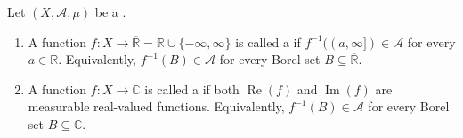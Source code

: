 \begin{definition} \label{definition:measurable_function_from_a_measure_space_into_the_extended_real_line_or_complex_plane}
Let $(X, \mathcal{A}, \mu)$ be a .

\begin{enumerate}
  \item A function $f : X \to \overline{\mathbb{R}} = \mathbb{R} \cup \{-\infty, \infty\}$ is called a  if $f^{-1}((a, \infty]) \in \mathcal{A}$ for every $a \in \mathbb{R}$. Equivalently, $f^{-1}(B) \in \mathcal{A}$ for every Borel set $B \subseteq \overline{\mathbb{R}}$.

  \item A function $f : X \to \mathbb{C}$ is called a  if both $\operatorname{Re}(f)$ and $\operatorname{Im}(f)$ are measurable real-valued functions. Equivalently, $f^{-1}(B) \in \mathcal{A}$ for every Borel set $B \subseteq \mathbb{C}$.

\end{enumerate}
\end{definition}
